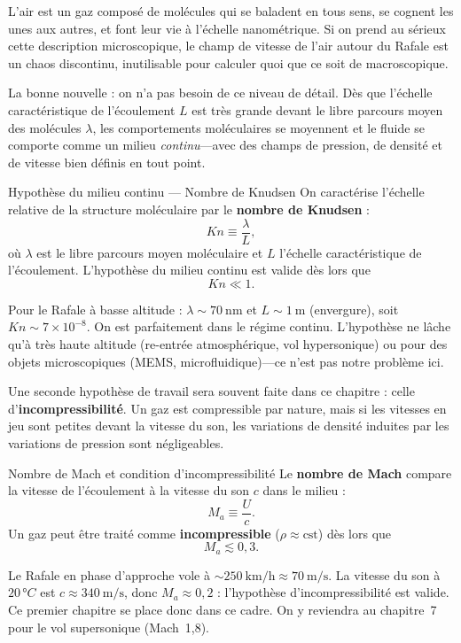 \documentclass[11pt,a4paper]{report}
\begin{document}
L'air est un gaz composé de molécules qui se baladent en tous sens, se cognent
les unes aux autres, et font leur vie à l'échelle nanométrique. Si on prend au
sérieux cette description microscopique, le champ de vitesse de l'air autour du
Rafale est un chaos discontinu, inutilisable pour calculer quoi que ce soit de
macroscopique.

La bonne nouvelle : on n'a pas besoin de ce niveau de détail. Dès que l'échelle
caractéristique de l'écoulement $L$ est très grande devant le libre parcours moyen
des molécules $\lambda$, les comportements moléculaires se moyennent et le fluide
se comporte comme un milieu \textit{continu}---avec des champs de pression, de
densité et de vitesse bien définis en tout point.

\begin{defbox}{Hypothèse du milieu continu --- Nombre de Knudsen}
On caractérise l'échelle relative de la structure moléculaire par le
\textbf{nombre de Knudsen} :
\[
    Kn \equiv \frac{\lambda}{L},
\]
où $\lambda$ est le libre parcours moyen moléculaire et $L$ l'échelle caractéristique
de l'écoulement. L'hypothèse du milieu continu est valide dès lors que
\[
    Kn \ll 1.
\]
\end{defbox}

Pour le Rafale à basse altitude : $\lambda \sim 70~\text{nm}$ et $L \sim 1~\text{m}$
(envergure), soit $Kn \sim 7 \times 10^{-8}$. On est parfaitement dans le régime
continu. L'hypothèse ne lâche qu'à très haute altitude (re-entrée atmosphérique,
vol hypersonique) ou pour des objets microscopiques (MEMS, microfluidique)---ce n'est
pas notre problème ici.

Une seconde hypothèse de travail sera souvent faite dans ce chapitre : celle
d'\textbf{incompressibilité}. Un gaz est compressible par nature, mais si les vitesses
en jeu sont petites devant la vitesse du son, les variations de densité induites par
les variations de pression sont négligeables.

\begin{defbox}{Nombre de Mach et condition d'incompressibilité}
Le \textbf{nombre de Mach} compare la vitesse de l'écoulement à la vitesse du son $c$
dans le milieu :
\[
    M_a \equiv \frac{U}{c}.
\]
Un gaz peut être traité comme \textbf{incompressible} ($\rho \approx \text{cst}$)
dès lors que
\[
    M_a \lesssim 0{,}3.
\]
\end{defbox}

Le Rafale en phase d'approche vole à $\sim 250~\text{km/h} \approx 70~\text{m/s}$.
La vitesse du son à $20\,°C$ est $c \approx 340~\text{m/s}$, donc $M_a \approx 0{,}2$ :
l'hypothèse d'incompressibilité est valide. Ce premier chapitre se place donc dans ce
cadre. On y reviendra au chapitre~7 pour le vol supersonique (Mach~1{,}8).
\end{document}
